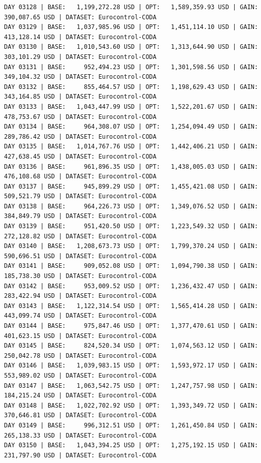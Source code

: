 \documentclass[11pt,a4paper]{article}
\begin{document}
\begin{verbatim}
DAY 03128 | BASE:   1,199,272.28 USD | OPT:   1,589,359.93 USD | GAIN: 390,087.65 USD | DATASET: Eurocontrol-CODA
DAY 03129 | BASE:   1,037,985.96 USD | OPT:   1,451,114.10 USD | GAIN: 413,128.14 USD | DATASET: Eurocontrol-CODA
DAY 03130 | BASE:   1,010,543.60 USD | OPT:   1,313,644.90 USD | GAIN: 303,101.29 USD | DATASET: Eurocontrol-CODA
DAY 03131 | BASE:     952,494.23 USD | OPT:   1,301,598.56 USD | GAIN: 349,104.32 USD | DATASET: Eurocontrol-CODA
DAY 03132 | BASE:     855,464.57 USD | OPT:   1,198,629.43 USD | GAIN: 343,164.85 USD | DATASET: Eurocontrol-CODA
DAY 03133 | BASE:   1,043,447.99 USD | OPT:   1,522,201.67 USD | GAIN: 478,753.67 USD | DATASET: Eurocontrol-CODA
DAY 03134 | BASE:     964,308.07 USD | OPT:   1,254,094.49 USD | GAIN: 289,786.42 USD | DATASET: Eurocontrol-CODA
DAY 03135 | BASE:   1,014,767.76 USD | OPT:   1,442,406.21 USD | GAIN: 427,638.45 USD | DATASET: Eurocontrol-CODA
DAY 03136 | BASE:     961,896.35 USD | OPT:   1,438,005.03 USD | GAIN: 476,108.68 USD | DATASET: Eurocontrol-CODA
DAY 03137 | BASE:     945,899.29 USD | OPT:   1,455,421.08 USD | GAIN: 509,521.79 USD | DATASET: Eurocontrol-CODA
DAY 03138 | BASE:     964,226.73 USD | OPT:   1,349,076.52 USD | GAIN: 384,849.79 USD | DATASET: Eurocontrol-CODA
DAY 03139 | BASE:     951,420.50 USD | OPT:   1,223,549.32 USD | GAIN: 272,128.82 USD | DATASET: Eurocontrol-CODA
DAY 03140 | BASE:   1,208,673.73 USD | OPT:   1,799,370.24 USD | GAIN: 590,696.51 USD | DATASET: Eurocontrol-CODA
DAY 03141 | BASE:     909,052.08 USD | OPT:   1,094,790.38 USD | GAIN: 185,738.30 USD | DATASET: Eurocontrol-CODA
DAY 03142 | BASE:     953,009.52 USD | OPT:   1,236,432.47 USD | GAIN: 283,422.94 USD | DATASET: Eurocontrol-CODA
DAY 03143 | BASE:   1,122,314.54 USD | OPT:   1,565,414.28 USD | GAIN: 443,099.74 USD | DATASET: Eurocontrol-CODA
DAY 03144 | BASE:     975,847.46 USD | OPT:   1,377,470.61 USD | GAIN: 401,623.15 USD | DATASET: Eurocontrol-CODA
DAY 03145 | BASE:     824,520.34 USD | OPT:   1,074,563.12 USD | GAIN: 250,042.78 USD | DATASET: Eurocontrol-CODA
DAY 03146 | BASE:   1,039,983.15 USD | OPT:   1,593,972.17 USD | GAIN: 553,989.02 USD | DATASET: Eurocontrol-CODA
DAY 03147 | BASE:   1,063,542.75 USD | OPT:   1,247,757.98 USD | GAIN: 184,215.24 USD | DATASET: Eurocontrol-CODA
DAY 03148 | BASE:   1,022,702.92 USD | OPT:   1,393,349.72 USD | GAIN: 370,646.81 USD | DATASET: Eurocontrol-CODA
DAY 03149 | BASE:     996,312.51 USD | OPT:   1,261,450.84 USD | GAIN: 265,138.33 USD | DATASET: Eurocontrol-CODA
DAY 03150 | BASE:   1,043,394.25 USD | OPT:   1,275,192.15 USD | GAIN: 231,797.90 USD | DATASET: Eurocontrol-CODA

\end{verbatim}
\end{document}
